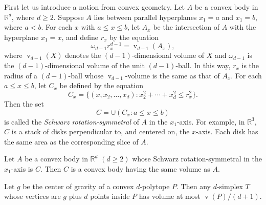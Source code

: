 \documentclass{cccg10}
\DeclareMathOperator{\od}{d}
\DeclareMathOperator{\vol}{v}
\DeclareMathOperator{\cog}{c}
\newcommand{\R}{\mathbb{R}}
\begin{document}
%
%
%
%


First let us introduce a notion from convex geometry. Let $A$ be a convex body in $\mathbb{R}^{d}$, where $d \geq 2$. Suppose $A$ lies between parallel hyperplanes $x_{1} = a$ and $x_{1} = b$, where $a < b$. For each $x$ with $a \leq x \leq b$, let $A_{x}$ be the intersection of $A$ with the hyperplane $x_{1} = x$, and define $r_{x}$ by the equation
\[ \omega_{d-1}r_{x}^{d-1} = \vol_{d-1}(A_{x}), \]
where $\vol_{d-1}(X)$ denotes the $(d-1)$-dimensional volume of $X$ and
$\omega_{d-1}$ is the $(d-1)$-dimensional volume of the unit $(d-1)$-ball.
In this way, $r_{x}$ is the radius of a $(d-1)$-ball whose $\vol_{d-1}$-volume is the same as that of $A_{x}$. For each $a \leq x \leq b$, let $C_{x}$ be defined by the equation
\[ C_{x} = \{ (x, x_{2}, \ldots, x_{d}) : x_{2}^{2} + \cdots + x_{d}^{2} \leq r_{x}^{2} \}. \]
Then the set
\[ C = \cup (C_{x} : a \leq x \leq b) \]
is called the \emph{Schwarz rotation-symmetral} of $A$ in the $x_{1}$-axis.
For example, in $\R^3$, $C$ is a stack of disks perpendicular to, and
centered on, the $x$-axis. Each disk has the same area as the corresponding
slice of $A$.

\begin{theorem}
  \label{thm:webs}
  Let $A$ be a convex body in $\mathbb{R}^{d}$ $(d \geq 2)$ whose Schwarz rotation-symmetral in the $x_{1}$-axis is $C$. Then $C$ is a convex body having the same volume as $A$.
\end{theorem}


\begin{lemma}
  \label{lem:simpvol}
  Let $g$ be the center of gravity of a convex $d$-polytope $P$. Then
  any $d$-simplex $T$ whose vertices are $g$ plus $d$ points inside $P$
  has volume at most $\vol(P)/(d+1)$.
\end{lemma}
\end{document}
